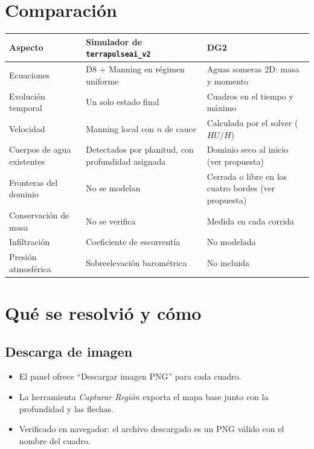 \documentclass[11pt,a4paper]{article}
\begin{document}
\section{Comparación}

\begin{center}
\small
\begin{tabular}{>{\raggedright\arraybackslash}p{3.6cm} >{\raggedright\arraybackslash}p{5.3cm} >{\raggedright\arraybackslash}p{5.3cm}}
\toprule
\textbf{Aspecto} & \textbf{Simulador de \texttt{terrapulseai\_v2}} & \textbf{DG2} \\
\midrule
Ecuaciones & D8 + Manning en régimen uniforme & Aguas someras 2D: masa y momento \\
Evolución temporal & Un solo estado final & Cuadros en el tiempo y máximo \\
Velocidad & Manning local con $n$ de cauce & Calculada por el solver ($HU/H$) \\
Cuerpos de agua existentes & Detectados por planitud, con profundidad asignada & Dominio seco al inicio (ver propuesta) \\
Fronteras del dominio & No se modelan & Cerrada o libre en los cuatro bordes (ver propuesta) \\
Conservación de masa & No se verifica & Medida en cada corrida \\
Infiltración & Coeficiente de escorrentía & No modelada \\
Presión atmosférica & Sobreelevación barométrica & No incluida \\
\bottomrule
\end{tabular}
\end{center}

\section{Qué se resolvió y cómo}

\subsection*{Descarga de imagen}
\begin{itemize}
  \item El panel ofrece ``Descargar imagen PNG'' para cada cuadro.
  \item La herramienta \emph{Capturar Región} exporta el mapa base junto con la profundidad y las flechas.
  \item Verificado en navegador: el archivo descargado es un PNG válido con el nombre del cuadro.
\end{itemize}
\end{document}
